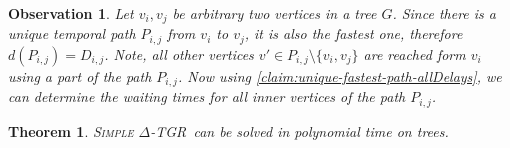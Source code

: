 \documentclass[11pt,a4paper]{article}
\newtheorem{theorem}{Theorem}
\newtheorem{observation}{Observation}
\theoremstyle{remark}
\theoremstyle{definition}
\newcommand{\deltaExact}{\textsc{Simple $\Delta$-TGR}}
\begin{document}
\begin{observation}\label{obs:travel-delays-in-trees}
    Let $v_i,v_j$  be arbitrary two vertices in a tree $G$. 
    Since there is a unique temporal path $P_{i,j}$ from $v_i$ to $v_j$, it is also the fastest one, therefore $d(P_{i,j}) = D_{i,j}$. 
    Note, all other vertices $v' \in P_{i,j} \setminus \{v_i,v_j\}$ are reached form $v_i$ using a part of the path $P_{i,j}$.
    Now using \cref{claim:unique-fastest-path-allDelays}, we can determine the waiting times for all \emph{inner} vertices of the path $P_{i,j}$.
\end{observation}

\begin{theorem} \label{thm:deltaExact-PolyTimeTrees}
    \deltaExact\ can be solved in polynomial time on trees.
\end{theorem}
\end{document}
